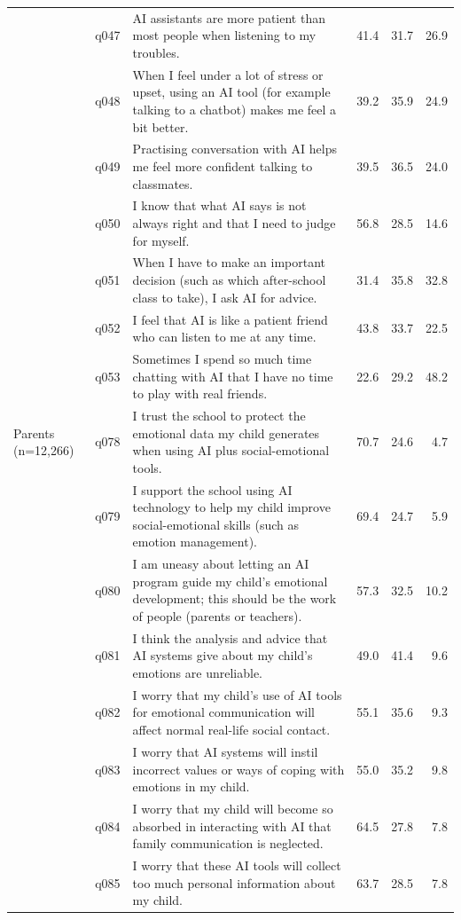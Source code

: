 \begin{longtable}{@{}p{}l p{} rrr@{}}
 & q047 & AI assistants are more patient than most people when listening to my troubles. & 41.4 & 31.7 & 26.9 \\
 & q048 & When I feel under a lot of stress or upset, using an AI tool (for example talking to a chatbot) makes me feel a bit better. & 39.2 & 35.9 & 24.9 \\
 & q049 & Practising conversation with AI helps me feel more confident talking to classmates. & 39.5 & 36.5 & 24.0 \\
 & q050 & I know that what AI says is not always right and that I need to judge for myself. & 56.8 & 28.5 & 14.6 \\
 & q051 & When I have to make an important decision (such as which after-school class to take), I ask AI for advice. & 31.4 & 35.8 & 32.8 \\
 & q052 & I feel that AI is like a patient friend who can listen to me at any time. & 43.8 & 33.7 & 22.5 \\
 & q053 & Sometimes I spend so much time chatting with AI that I have no time to play with real friends. & 22.6 & 29.2 & 48.2 \\
Parents (n=12,266) & q078 & I trust the school to protect the emotional data my child generates when using AI plus social-emotional tools. & 70.7 & 24.6 & 4.7 \\
 & q079 & I support the school using AI technology to help my child improve social-emotional skills (such as emotion management). & 69.4 & 24.7 & 5.9 \\
 & q080 & I am uneasy about letting an AI program guide my child's emotional development; this should be the work of people (parents or teachers). & 57.3 & 32.5 & 10.2 \\
 & q081 & I think the analysis and advice that AI systems give about my child's emotions are unreliable. & 49.0 & 41.4 & 9.6 \\
 & q082 & I worry that my child's use of AI tools for emotional communication will affect normal real-life social contact. & 55.1 & 35.6 & 9.3 \\
 & q083 & I worry that AI systems will instil incorrect values or ways of coping with emotions in my child. & 55.0 & 35.2 & 9.8 \\
 & q084 & I worry that my child will become so absorbed in interacting with AI that family communication is neglected. & 64.5 & 27.8 & 7.8 \\
 & q085 & I worry that these AI tools will collect too much personal information about my child. & 63.7 & 28.5 & 7.8 \\

\end{longtable}
